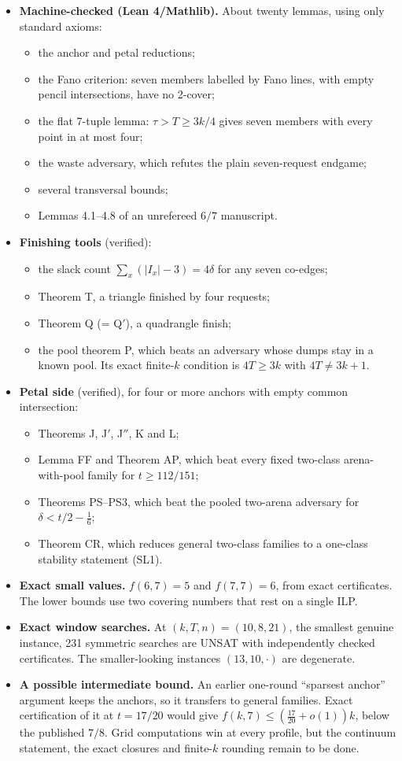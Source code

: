\documentclass[11pt]{article}
\begin{document}
\begin{itemize}
\item \textbf{Machine-checked (Lean 4/Mathlib).} About twenty lemmas, using only standard axioms:
 \begin{itemize}
 \item the anchor and petal reductions;
 \item the Fano criterion: seven members labelled by Fano lines, with empty pencil intersections, have no 2-cover;
 \item the flat 7-tuple lemma: $\tau>T\ge 3k/4$ gives seven members with every point in at most four;
 \item the waste adversary, which refutes the plain seven-request endgame;
 \item several transversal bounds;
 \item Lemmas 4.1--4.8 of an unrefereed $6/7$ manuscript.
 \end{itemize}
\item \textbf{Finishing tools} (verified):
 \begin{itemize}
 \item the slack count $\sum_x(|I_x|-3)=4\delta$ for any seven co-edges;
 \item Theorem T, a triangle finished by four requests;
 \item Theorem Q (= Q$'$), a quadrangle finish;
 \item the pool theorem P, which beats an adversary whose dumps stay in a known pool. Its exact finite-$k$ condition is
 $4T\ge 3k$ with $4T\ne 3k+1$.
 \end{itemize}
\item \textbf{Petal side} (verified), for four or more anchors with empty common intersection:
 \begin{itemize}
 \item Theorems J, J$'$, J$''$, K and L;
 \item Lemma FF and Theorem AP, which beat every fixed two-class arena-with-pool family for $t\ge 112/151$;
 \item Theorems PS--PS3, which beat the pooled two-arena adversary for $\delta<t/2-\tfrac16$;
 \item Theorem CR, which reduces general two-class families to a one-class stability statement (SL1).
 \end{itemize}
\item \textbf{Exact small values.} $f(6,7)=5$ and $f(7,7)=6$, from exact certificates. The lower bounds use two covering
numbers that rest on a single ILP.
\item \textbf{Exact window searches.} At $(k,T,n)=(10,8,21)$, the smallest genuine instance, 231 symmetric searches are
UNSAT with independently checked certificates. The smaller-looking instances $(13,10,\cdot)$ are degenerate.
\item \textbf{A possible intermediate bound.} An earlier one-round ``sparsest anchor'' argument keeps the anchors, so it
transfers to general families. Exact certification of it at $t=17/20$ would give
$f(k,7)\le(\tfrac{17}{20}+o(1))k$, below the published $7/8$. Grid computations win at every profile, but the
continuum statement, the exact closures and finite-$k$ rounding remain to be done.
\end{itemize}
\end{document}
